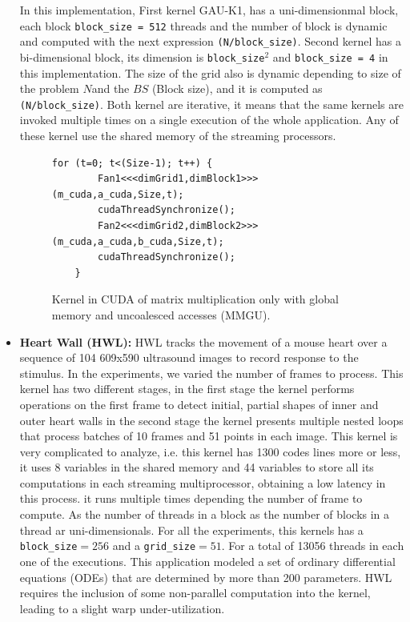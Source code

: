 \begin{itemize}
In this implementation, First kernel GAU-K1, has a uni-dimensionmal block, each block \texttt{block\_size = 512} threads and the number of block is dynamic and computed with the next expression \texttt{(N/block\_size)}. Second kernel has a bi-dimensional block, its dimension is \texttt{block\_size}$^2$ and \texttt{block\_size = 4} in this implementation. The size of the grid also is dynamic depending to size of the problem $N$and the $BS$ (Block size), and it is computed as \texttt{(N/block\_size)}. Both kernel are iterative, it means that the same kernels are invoked multiple times on a single execution of the whole application. Any of these kernel use the shared memory of the streaming processors. 


\begin{figure}[htpb]
\centering
{\scriptsize
\begin{lstlisting}
for (t=0; t<(Size-1); t++) {
		Fan1<<<dimGrid1,dimBlock1>>>(m_cuda,a_cuda,Size,t);
		cudaThreadSynchronize();
		Fan2<<<dimGrid2,dimBlock2>>>(m_cuda,a_cuda,b_cuda,Size,t);
		cudaThreadSynchronize();
	}
\end{lstlisting}}
\caption{Kernel in CUDA of matrix multiplication only with global memory and uncoalesced accesses (MMGU).}
\label{fig:GauCode}
\end{figure}

\item {\bf Heart Wall (HWL):}
HWL tracks the movement of a mouse heart over a sequence of 104 609x590 ultrasound images to record response to the stimulus. In the experiments, we varied the number of frames to process. This kernel has two different stages, in the first stage the kernel performs operations on the first frame to detect initial, partial shapes of inner and outer heart walls in the second stage the kernel presents multiple nested loops that process batches of 10 frames and 51 points in each image. This kernel is very complicated to analyze, i.e. this kernel has 1300 codes lines more or less, it uses 8 variables in the shared memory and 44 variables to store all its computations in each streaming multiprocessor, obtaining a low latency in this process. it runs multiple times depending the number of frame to compute. As the number of threads in a block as the number of blocks in a thread ar uni-dimensionals. For all the experiments, this kernels has a \texttt{block\_size}$= 256$ and a \texttt{grid\_size}$ = 51$. For a total of 13056 threads in each one of the executions. This application modeled a set of  ordinary differential equations (ODEs) that are determined by more than 200 parameters. HWL requires the inclusion of some non-parallel computation into the kernel, leading to a slight warp under-utilization.


\end{itemize}
